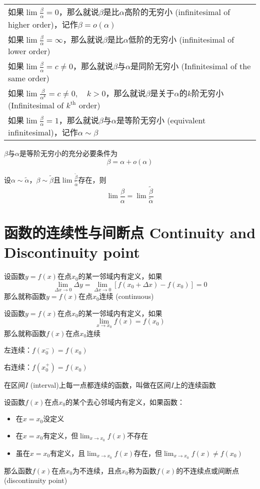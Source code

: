 \documentclass[UTF8]{ctexart}
\begin{document}
\begin{tabular}{l}
  如果$\lim\frac{\beta}{\alpha}=0$，那么就说$\beta$是比$\alpha$高阶的无穷小 (infinitesimal of higher order)，记作$\beta=o(\alpha)$\\
  如果$\lim\frac{\beta}{\alpha}=\infty$，那么就说$\beta$是比$\alpha$低阶的无穷小 (infinitesimal of lower order)\\
  如果$\lim\frac{\beta}{\alpha}=c\ne0$，那么就说$\beta$与$\alpha$是同阶无穷小 (Infinitesimal of the same order)\\
  如果$\lim\frac{\beta}{\alpha^k}=c\ne0,\quad k>0$，那么就说$\beta$是关于$\alpha$的$k$阶无穷小 (Infinitesimal of $k^\text{th}$ order)\\
  如果$\lim\frac{\beta}{\alpha}=1$，那么就说$\beta$与$\alpha$是等阶无穷小 (equivalent infinitesimal)，记作$\alpha\sim\beta$
\end{tabular}

\bigskip

$\beta$与$\alpha$是等阶无穷小的充分必要条件为
\[ \beta=\alpha+o(\alpha) \]

\bigskip

设$\alpha\sim\tilde{\alpha}$，$\beta\sim\tilde{\beta}$且$\lim\frac{\tilde{\beta}}{\tilde{\alpha}}$存在，则
\[ \lim\frac{\beta}{\alpha}=\lim\frac{\tilde{\beta}}{\tilde{\alpha}} \]
\bigskip
\bigskip
\section*{函数的连续性与间断点 Continuity and Discontinuity point}

\bigskip

设函数$y=f(x)$在点$x_0$的某一邻域内有定义，如果
\[ \lim_{\Delta x\to0}\Delta y=\lim_{\Delta x\to0}[f(x_0+\Delta x)-f(x_0)]=0 \]
那么就称函数$y=f(x)$在点$x_0$连续 (continuous)

\bigskip

设函数$y=f(x)$在点$x_0$的某一邻域内有定义，如果
\[ \lim_{x\to x_0}f(x)=f(x_0) \]
那么就称函数$f(x)$在点$x_0$连续

\bigskip

左连续：$f(x_0^-)=f(x_0)$

右连续：$f(x_0^+)=f(x_0)$

\bigskip

在区间$I$ (interval)上每一点都连续的函数，叫做在区间$I$上的连续函数

\bigskip

\bigskip

设函数$f(x)$在点$x_0$的某个去心邻域内有定义，如果函数：
\begin{itemize}
  \item 在$x=x_0$没定义
  \item 在$x=x_0$有定义，但$\lim_{x\to x_0}f(x)$不存在
  \item 虽在$x=x_0$有定义，且$\lim_{x\to x_0}f(x)$存在，但$\lim_{x\to x_0}f(x)\ne f(x_0)$
\end{itemize}
那么函数$f(x)$在点$x_0$为不连续，且点$x_0$称为函数$f(x)$的不连续点或间断点 (discontinuity point)
\end{document}
